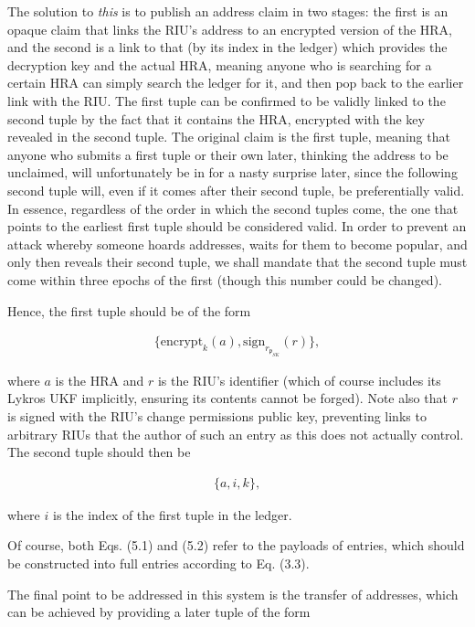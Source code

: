 \documentclass{extreport}
\begin{document}
The solution to \emph{this} is to publish an address claim in two stages: the first is an opaque claim that links the RIU's address to an encrypted version of the HRA, and the second is a link to that (by its index in the ledger) which provides the decryption key and the actual HRA, meaning anyone who is searching for a certain HRA can simply search the ledger for it, and then pop back to the earlier link with the RIU. The first tuple can be confirmed to be validly linked to the second tuple by the fact that it contains the HRA, encrypted with the key revealed in the second tuple. The original claim is the first tuple, meaning that anyone who submits a first tuple or their own later, thinking the address to be unclaimed, will unfortunately be in for a nasty surprise later, since the following second tuple will, even if it comes after their second tuple, be preferentially valid. In essence, regardless of the order in which the second tuples come, the one that points to the earliest first tuple should be considered valid. In order to prevent an attack whereby someone hoards addresses, waits for them to become popular, and only then reveals their second tuple, we shall mandate that the second tuple must come within three epochs of the first (though this number could be changed).

Hence, the first tuple should be of the form

\begin{align*}
\{ \mathrm{encrypt}_k(a), \mathrm{sign}_{r_{\mathfrak{p}_{SK}}}(r) \}, \tag{5.1}
\end{align*}

where \(a\) is the HRA and \(r\) is the RIU's identifier (which of course includes its Lykros UKF implicitly, ensuring its contents cannot be forged). Note also that \(r\) is signed with the RIU's change permissions public key, preventing links to arbitrary RIUs that the author of such an entry as this does not actually control. The second tuple should then be

\begin{align*}
\{ a, i, k \}, \tag{5.2}
\end{align*}

where \(i\) is the index of the first tuple in the ledger.

Of course, both Eqs. (5.1) and (5.2) refer to the payloads of entries, which should be constructed into full entries according to Eq. (3.3).

The final point to be addressed in this system is the transfer of addresses, which can be achieved by providing a later tuple of the form
\end{document}

